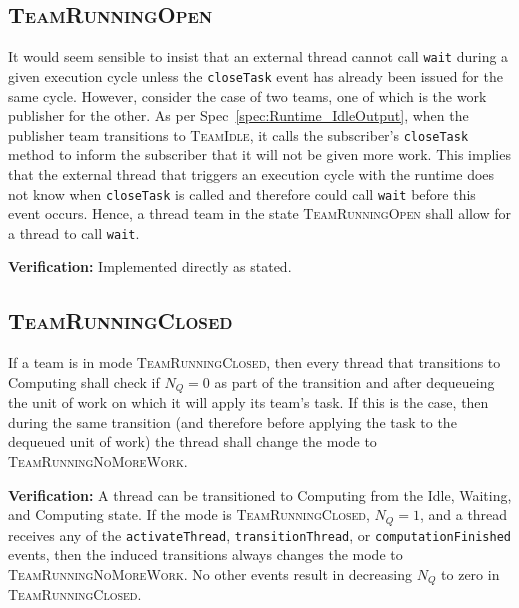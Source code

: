 \documentclass{article}
\newcommand{\TeamIdle}          {\textsc{TeamIdle}}
\newcommand{\TeamRunningOpen}   {\textsc{TeamRunningOpen}}
\newcommand{\TeamRunningClosed} {\textsc{TeamRunningClosed}}
\newcommand{\TeamRunningNoMoreWork} {\textsc{TeamRunningNoMoreWork}}
\begin{document}
\subsection{\TeamRunningOpen}
\begin{spec}
It  would seem sensible to insist that an external thread cannot call
\texttt{wait} during a given execution cycle unless the \texttt{closeTask} event
has already been issued for the same cycle.  However, consider the case of two
teams, one of which is the work publisher for the other.  As per
Spec~\ref{spec:Runtime_IdleOutput}, when the publisher team transitions to
{\TeamIdle}, it calls the subscriber's \texttt{closeTask} method to inform the
subscriber that it will not be given more work.  This implies that the external
thread that triggers an execution cycle with the runtime does not know when
\texttt{closeTask} is called and therefore could call \texttt{wait} before this
event occurs.  Hence, a thread team in the state {\TeamRunningOpen} shall allow
for a thread to call \texttt{wait}.
\end{spec}
\textbf{Verification:}\hspace{0.125in}  Implemented directly as stated.

\subsection{\TeamRunningClosed}
\begin{spec}
\label{spec:Closed_Transition}
If a team is in mode \TeamRunningClosed, then every thread that transitions to
Computing shall check if $N_Q = 0$ as part of the transition and after
dequeueing the unit of work on which it will apply its team's task.  If this is
the case, then during the same transition (and therefore before applying the
task to the dequeued unit of work) the thread shall change the mode to
\TeamRunningNoMoreWork.
\end{spec}
\textbf{Verification:}\hspace{0.125in}  A thread can be transitioned to
Computing from the Idle, Waiting, and Computing state.  If the mode is
{\TeamRunningClosed}, $N_Q = 1$, and a
thread receives any of the \texttt{activateThread}, \texttt{transitionThread},
or \texttt{computationFinished} events, then the induced transitions always changes
the mode to \TeamRunningNoMoreWork.  No other events result in decreasing $N_Q$
to zero in \TeamRunningClosed.
\end{document}
